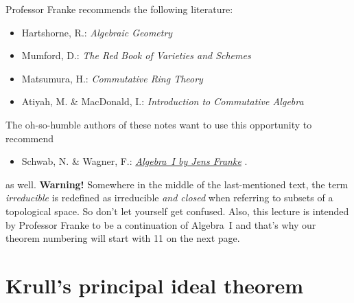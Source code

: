\documentclass[a4paper,parskip=half,numbers=enddot, DIV=12, headheight=30pt]{scrreprt}
\begin{document}
Professor Franke recommends the following literature:
\begin{itemize}
	\item Hartshorne, R.: \emph{Algebraic Geometry}
	\item Mumford, D.: \emph{The Red Book of Varieties and Schemes}
	\item Matsumura, H.: \emph{Commutative Ring Theory} \cite{matsumuraCRT}
	\item Atiyah, M. \& MacDonald, I.: \emph{Introduction to Commutative Algebra}
\end{itemize}
The oh-so-humble authors of these notes want to use this opportunity to recommend
\begin{itemize}
	\item Schwab, N. \& Wagner, F.:  \href{https://github.com/Nicholas42/AlgebraFranke/tree/master/AlgebraI}{\emph{Algebra~I by Jens Franke}} \cite{alg1}.
\end{itemize}
as well. \textbf{Warning!} Somewhere in the middle of the last-mentioned text, the term \emph{irreducible} is redefined as irreducible \emph{and closed} when referring to subsets of a topological space. So don't let yourself get confused. Also, this lecture is intended by Professor Franke to be a continuation of Algebra~I and that's why our theorem numbering will start with 11 on the next page. 

\chapter{Krull's principal ideal theorem}
\end{document}

